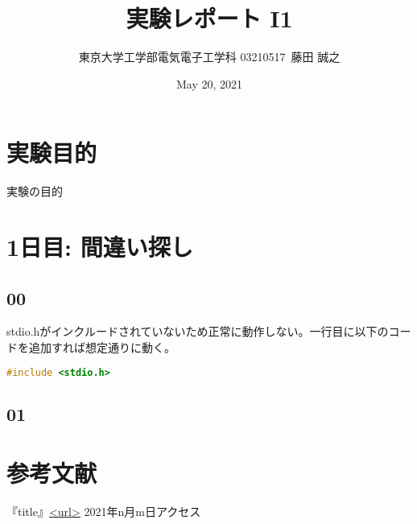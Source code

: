 \documentclass{ltjsarticle}
\title{実験レポート I1}
\author{東京大学工学部電気電子工学科 03210517\ 藤田 誠之 }
\date{ May 20, 2021}
\begin{document}
\maketitle
\section{実験目的}
実験の目的
\section{1日目: 間違い探し}
\subsection{00}
stdio.hがインクルードされていないため正常に動作しない。一行目に以下のコードを追加すれば想定通りに動く。
\begin{lstlisting}[caption=p00.c 追加部分,language=C]
    #include <stdio.h>
\end{lstlisting}
\subsection{01}


\section{参考文献}
『title』\url{<url>} 2021年n月m日アクセス
\end{document}

